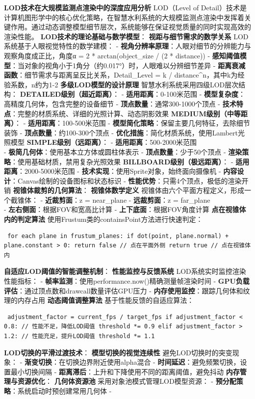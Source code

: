 \textbf{LOD技术在大规模监测点渲染中的深度应用分析} LOD（Level of Detail）技术是计算机图形学中的核心优化策略，在智慧水利系统的大规模监测点渲染中发挥着关键作用。通过动态调整模型细节层次，系统能够在保证视觉质量的同时实现高效的渲染性能。 \textbf{LOD技术的理论基础与数学模型}： \textbf{视距与细节需求的数学关系} LOD系统基于人眼视觉特性的数学建模： - \textbf{视角分辨率原理}：人眼对细节的分辨能力与观察角度成正比，角度α = 2 * arctan(object\_size / (2 * distance)) - \textbf{感知阈值模型}：当对象的视角小于1角分（约0.017°）时，人眼难以分辨细节差异 - \textbf{距离衰减函数}：细节需求与距离呈反比关系，Detail\_Level = k / distance\^{}n，其中k为经验系数，n约为1-2 \textbf{多级LOD模型的设计原理} 智慧水利系统采用四级LOD层次结构： \textbf{DETAILED级别（超近距离）}： - \textbf{适用距离}：0-100米范围 - \textbf{模型复杂度}：高精度几何体，包含完整的设备细节 - \textbf{顶点数量}：通常300-1000个顶点 - \textbf{技术特点}：完整的材质系统、详细的光照计算、动态阴影效果 \textbf{MEDIUM级别（中等距离）}： - \textbf{适用距离}：100-500米范围 - \textbf{模型简化策略}：保留主要几何特征，去除细节装饰 - \textbf{顶点数量}：约100-300个顶点 - \textbf{优化措施}：简化材质系统，使用Lambert光照模型 \textbf{SIMPLE级别（远距离）}： - \textbf{适用距离}：500-2000米范围\\ - \textbf{极简几何体}：使用基本立方体或圆柱体表示 - \textbf{顶点数量}：少于50个顶点 - \textbf{渲染策略}：使用基础材质，禁用复杂光照效果 \textbf{BILLBOARD级别（极远距离）}： - \textbf{适用距离}：2000-5000米范围 - \textbf{技术实现}：使用Sprite对象，始终面向摄像机 - \textbf{内容设计}：Canvas绘制的设备图标和状态标识 - \textbf{性能优势}：只需4个顶点，极低的渲染开销 \textbf{视锥体裁剪的几何算法}： \textbf{视锥体数学定义} 视锥体由六个平面方程定义，形成一个截锥体： - \textbf{近裁剪面}：z = near\_plane - \textbf{远裁剪面}：z = far\_plane\\ - \textbf{左右侧面}：根据FOV和宽高比计算 - \textbf{上下底面}：根据FOV角度计算 \textbf{点在视锥体内的判定算法} 使用Frustum类的containsPoint方法进行快速判定： \begin{verbatim} for each plane in frustum_planes: if dot(point, plane.normal) + plane.constant > 0: return false // 点在平面外侧 return true // 点在视锥体内 \end{verbatim} \textbf{自适应LOD阈值的智能调整机制}： \textbf{性能监控与反馈系统} LOD系统实时监控渲染性能指标： - \textbf{帧率监测}：使用performance.now()精确测量帧渲染时间 - \textbf{GPU负载评估}：通过顶点数和drawcall数量评估GPU压力 - \textbf{内存使用监控}：跟踪几何体和纹理的内存占用 \textbf{动态阈值调整算法} 基于性能反馈的自适应算法： \begin{verbatim} adjustment_factor = current_fps / target_fps if adjustment_factor < 0.8: // 性能不足，降低LOD阈值 threshold *= 0.9 elif adjustment_factor > 1.2: // 性能充足，提升LOD阈值 threshold *= 1.1 \end{verbatim} \textbf{LOD切换的平滑过渡技术}： \textbf{模型切换的视觉连续性} 避免LOD切换时的突变现象： - \textbf{渐变切换}：在切换边界附近使用alpha混合 - \textbf{时间延迟}：避免频繁切换，设置最小切换间隔 - \textbf{距离滞后}：上升和下降使用不同的距离阈值，避免抖动 \textbf{内存管理与资源优化}： \textbf{几何体资源池} 采用对象池模式管理LOD模型资源： - \textbf{预分配策略}：系统启动时预创建常用几何体 - 
